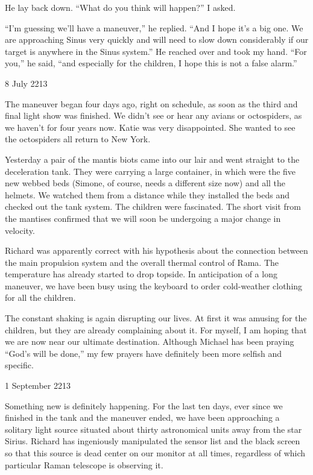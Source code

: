 \documentclass[]{article}
\begin{document}
{He lay back down. “What do you think will happen?” I asked.

“I’m guessing we’ll have a maneuver,” he replied. “And I hope it’s a big one. We are approaching Sinus very quickly and will need to slow down considerably if our target is anywhere in the Sinus system.” He reached over and took my hand. “For you,” he said, “and especially for the children, I hope this is not a false alarm.”

8 July 2213

The maneuver began four days ago, right on schedule, as soon as the third and final light show was finished. We didn’t see or hear any avians or octospiders, as we haven’t for four years now. Katie was very disappointed. She wanted to see the octospiders all return to New York.

Yesterday a pair of the mantis biots came into our lair and went straight to the deceleration tank. They were carrying a large container, in which were the five new webbed beds (Simone, of course, needs a different size now) and all the helmets. We watched them from a distance while they installed the beds and checked out the tank system. The children were fascinated. The short visit from the mantises confirmed that we will soon be undergoing a major change in velocity.

Richard was apparently correct with his hypothesis about the connection between the main propulsion system and the overall thermal control of Rama. The temperature has already started to drop topside. In anticipation of a long maneuver, we have been busy using the keyboard to order cold-weather clothing for all the children.

The constant shaking is again disrupting our lives. At first it was amusing for the children, but they are already complaining about it. For myself, I am hoping that we are now near our ultimate destination. Although Michael has been praying “God’s will be done,” my few prayers have definitely been more selfish and specific.

1 September 2213

Something new is definitely happening. For the last ten days, ever since we finished in the tank and the maneuver ended, we have been approaching a solitary light source situated about thirty astronomical units away from the star Sirius. Richard has ingeniously manipulated the sensor list and the black screen so that this source is dead center on our monitor at all times, regardless of which particular Raman telescope is observing it.

}
\end{document}
